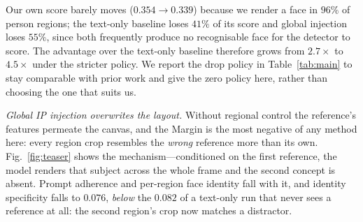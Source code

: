 \documentclass[review,10pt,times]{elsarticle}
\begin{document}
\begin{table}[htbp]
\centering
\caption{%
  \textbf{Reported ArcFace against the same score with missing faces counted
  as zero.}  Person samples of Mixed-Eval-v1, $115$ regions.  The ranking is
  unchanged, and the margin over every baseline widens, because the baselines
  are the ones that often render no face at all.%
}
\label{tab:detect}
\end{table}

Our own score barely moves ($0.354\!\to\!0.339$) because we render a face in
$96\%$ of person regions; the text-only baseline loses $41\%$ of its score and
global injection loses $55\%$, since both frequently produce no recognisable
face for the detector to score.  The advantage over the text-only baseline
therefore grows from $2.7\times$ to $4.5\times$ under the stricter policy.  We
report the drop policy in Table~\ref{tab:main} to stay comparable with prior
work and give the zero policy here, rather than choosing the one that suits
us.

\noindent\textit{Global IP injection overwrites the layout.}
Without regional control the reference's features permeate the canvas, and the
Margin is the most negative of any method here: every region crop resembles the
\emph{wrong} reference more than its own.  Fig.~\ref{fig:teaser} shows the
mechanism---conditioned on the first reference, the model renders that subject
across the whole frame and the second concept is absent.  Prompt adherence and
per-region face identity fall with it, and identity specificity falls to
$0.076$, \emph{below} the $0.082$ of a text-only run that never sees a
reference at all: the second region's crop now matches a distractor.
\end{document}
